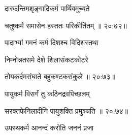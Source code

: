 {\devanagarifont दारुदन्तिमशृङ्गादिकर्म पार्थिवमुच्यते  \danda\dontdisplaylinenum }%


{\devanagarifont चतुष्कर्म समासेन हस्ततः परिकीर्तितम् {॥ २०:७२॥} \veg\dontdisplaylinenum }%



{\devanagarifont पादाभ्यां गमनं कर्म दिशश्च विदिशस्तथा \thinspace{\dandab} \dontdisplaylinenum }%

{\devanagarifont निम्नोन्नतसमे देशे शिलासंकटकोटरे  \danda\dontdisplaylinenum }%


{\devanagarifont तोयकर्दमसंघाते बहुकण्टकसंकुले {॥ २०:७३॥} \veg\dontdisplaylinenum }%



{\devanagarifont पायुकर्म विसर्गं तु कठिनद्रवपिच्छलम् \thinspace{\dandab} \dontdisplaylinenum }%


{\devanagarifont सरक्तफेनिलादीनि पायुशक्ति प्रमुञ्चति {॥ २०:७४॥} \veg\dontdisplaylinenum }%



{\devanagarifont उपस्थकर्म आनन्दं करोति जननं प्रजा \thinspace{\dandab} \dontdisplaylinenum }%

